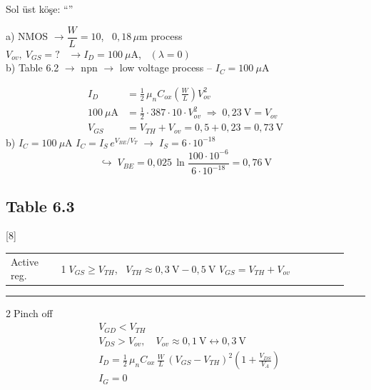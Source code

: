 \documentclass[11pt,a4paper]{article}
\begin{document}
{\small\color{kursunkalem}Sol üst köşe: ``''}

\begin{ornek}[6.1]
a) NMOS $\rightarrow \dfrac{W}{L} = 10$, \ $0{,}18\,\mu$m process\\
\hspace*{1.5em}$V_{ov},\ V_{GS} = ?$ \ $\rightarrow I_D = 100\ \mu\mathrm{A}$, \ $(\lambda = 0)$\\
b) Table 6.2 $\rightarrow$ npn $\rightarrow$ low voltage process -- $I_C = 100\ \mu\mathrm{A}$
\end{ornek}
\begin{cozum}
\begin{align*}
  I_D &= \frac{1}{2}\,\mu_n C_{ox}\left(\frac{W}{L}\right)V_{ov}^2\\
  100\ \mu\mathrm{A} &= \frac{1}{2}\cdot 387\cdot 10\cdot V_{ov}^2 \;\Rightarrow\; 0{,}23\ \mathrm{V} = V_{ov}\\
  V_{GS} &= V_{TH} + V_{ov} = 0{,}5 + 0{,}23 = 0{,}73\ \mathrm{V}
\end{align*}
b) $I_C = 100\ \mu\mathrm{A}$ \qquad $I_C = I_S\,e^{V_{BE}/V_T} \;\rightarrow\; I_S = 6\cdot10^{-18}$
\[
  \hookrightarrow\; V_{BE} = 0{,}025\,\ln\frac{100\cdot10^{-6}}{6\cdot10^{-18}} = 0{,}76\ \mathrm{V}
\]
\end{cozum}

\subsection{Table 6.3}
[8]

\noindent
\begin{tabular}{@{}p{0.14\linewidth}p{0.8\linewidth}@{}}
Active reg. &
\textcircled{\small 1}\quad $V_{GS} \ge V_{TH}$, \ $V_{TH} \approx 0{,}3\ \mathrm{V} - 0{,}5\ \mathrm{V}$\newline
\hspace*{1.6em}$V_{GS} = V_{TH} + V_{ov}$
\end{tabular}

\noindent\rule{0.6\linewidth}{0.4pt}

\noindent\hspace*{0.14\linewidth}\textcircled{\small 2}\quad Pinch off
\begin{align*}
  & V_{GD} < V_{TH}\\
  & V_{DS} > V_{ov}, \quad V_{ov} \approx 0{,}1\ \mathrm{V} \longleftrightarrow 0{,}3\ \mathrm{V}\\
  & I_D = \frac{1}{2}\,\mu_n C_{ox}\,\frac{W}{L}\,(V_{GS} - V_{TH})^2\left(1 + \frac{V_{DS}}{V_A}\right)\\
  & I_G = 0
\end{align*}
\end{document}
